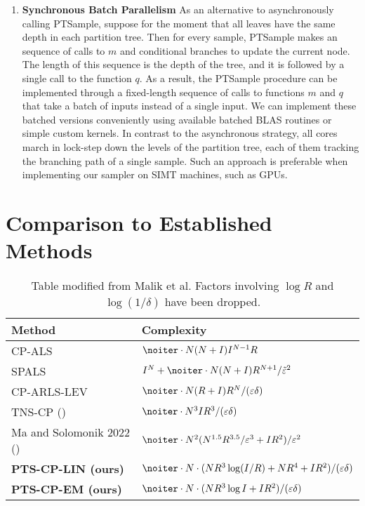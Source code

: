 \begin{enumerate}
    \item \textbf{Synchronous Batch Parallelism} As an alternative to asynchronously calling PTSample, suppose for the moment that all leaves have the same depth in each partition tree. Then for every sample, 
    PTSample makes an sequence of calls to $m$ and conditional branches to update the current node. The length of this sequence is the depth of the tree, and it is followed by a single call to the function $q$. As
    a result, the PTSample procedure can be implemented through a fixed-length sequence of calls to functions $m$ and $q$ that take a batch of inputs instead of a single input. We can implement 
    these batched versions conveniently using available batched BLAS routines or simple custom kernels. In contrast to the asynchronous 
    strategy, all cores march in lock-step down the levels of the partition tree, each of them tracking the branching path of 
    a single sample. Such an approach is preferable when implementing our sampler on SIMT machines, such as GPUs. 

\end{enumerate}

\section{Comparison to Established Methods}

\begin{table}[htb]
	\centering
	\begin{tabular}{ll}  
		\hline
		Method    											& Complexity 												\\
		\hline
		CP-ALS \cite{kolda2009TensorDecompositions}		& $\noiter \cdot N (N+I) I^{N-1} R$ 						\\
		SPALS \cite{cheng2016SPALSFast} 					& $I^N + \noiter \cdot N (N+I) R^{N+1} / \tilde{\varepsilon}^2$ 			\\	
		CP-ARLS-LEV	\cite{larsen2022PracticalLeverageBased}& $\noiter \cdot N ( R + I ) R^N / (\varepsilon \delta)$	\\
		TNS-CP (\cite{malik2022arbitrary})	   			& $\noiter \cdot N^3 I R^3 / (\varepsilon \delta)$ 			\\ 
		Ma and Solomonik 2022 (\cite{maCostEfficient})	   			& $\noiter \cdot N^2(N^{1.5} R^{3.5} / \varepsilon^3 + I R^2) / \varepsilon^2$ 			\\ 
		\textbf{PTS-CP-LIN (ours)}	   			& $\noiter \cdot N \cdot (N R^3 \log (I/R) + NR^4 + IR^2) / (\varepsilon \delta)$ 			\\ 
		\textbf{PTS-CP-EM (ours)}	   			& $\noiter \cdot N \cdot (N R^3 \log I + IR^2) / (\varepsilon \delta)$ 			\\
		\hline
	\end{tabular}
        \vspace{3pt}
	\caption{Table modified from Malik et al. Factors involving $\log R$ and 
        $\log (1 / \delta)$ have been dropped.} 
    \label{tab:cp-complexity-comparison}
\end{table}


